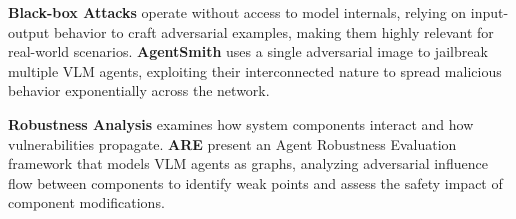 \textbf{Black-box Attacks} operate without access to model internals, relying on input-output behavior to craft adversarial examples, making them highly relevant for real-world scenarios. \textbf{AgentSmith} \cite{gu2024agent} uses a single adversarial image to jailbreak multiple VLM agents, exploiting their interconnected nature to spread malicious behavior exponentially across the network.

\textbf{Robustness Analysis} examines how system components interact and how vulnerabilities propagate. \textbf{ARE} \cite{wu2024adversarial} present an Agent Robustness Evaluation framework that models VLM agents as graphs, analyzing adversarial influence flow between components to identify weak points and assess the safety impact of component modifications.

